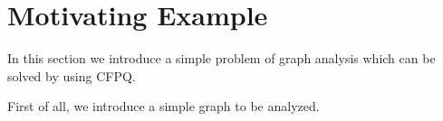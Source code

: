 \section{Motivating Example}

In this section we introduce a simple problem of graph analysis which can be solved by using CFPQ.

First of all, we introduce a simple graph to be analyzed.

